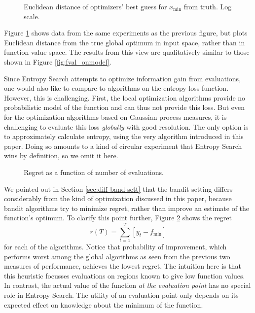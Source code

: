 \documentclass[twoside,11pt]{article}
\newcommand{\xmin}{x_{\min}}
\newcommand{\fmin}{f_{\min}}
\newcommand{\inputTikZ}[1]{%
 }
\newcommand{\inputTikZ}[1]{%
   \beginpgfgraphicnamed{#1-external}%
   \endpgfgraphicnamed%
 }
\begin{document}
\begin{figure}
  \centering
  \inputTikZ{figures/xdist_wB_2D_SE}
  \caption{Euclidean distance of optimizers' best guess for $\xmin$
    from truth. Log scale.}
  \label{fig:xval_onmodel}
\end{figure}

Figure \ref{fig:xval_onmodel} shows data from the same experiments as
the previous figure, but plots Euclidean distance from the true
global optimum in input space, rather than in function value
space. The results from this view are qualitatively similar to those
shown in Figure \ref{fig:fval_onmodel}.

Since Entropy Search attempts to optimize information gain from
evaluations, one would also like to compare to algorithms on the
entropy loss function. However, this is challenging. First, the local
optimization algorithms provide no probabilistic model of the function
and can thus not provide this loss. But even for the optimization
algorithms based on Gaussian process measures, it is challenging to
evaluate this loss \emph{globally} with good resolution. The only
option is to approximately calculate entropy, using the very algorithm
introduced in this paper. Doing so amounts to a kind of circular
experiment that Entropy Search wins by definition, so we omit it here.

\begin{figure}
  \centering
  \inputTikZ{figures/regret_wB_2D_SE}
  \caption{Regret as a function of number of evaluations.}
  \label{fig:regret}
\end{figure}

We pointed out in Section \ref{sec:diff-band-sett} that the bandit
setting differs considerably from the kind of optimization discussed
in this paper, because bandit algorithms try to minimize regret,
rather than improve an estimate of the function's optimum. To clarify
this point further, Figure \ref{fig:regret} shows the regret
\begin{equation}
  \label{eq:29}
  r(T) = \sum_{t=1} ^T [y_t - \fmin]
\end{equation}
for each of the algorithms. Notice that probability of improvement,
which performs worst among the global algorithms as seen from the
previous two measures of performance, achieves the lowest regret. The
intuition here is that this heuristic focusses evaluations on regions
known to give low function values. In contrast, the actual value of
the function \emph{at the evaluation point} has no special role in
Entropy Search. The utility of an evaluation point only depends on its
expected effect on knowledge about the minimum of the function.
\end{document}

